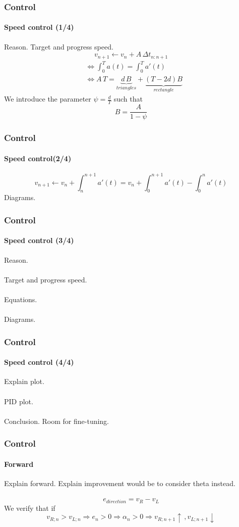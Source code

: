 \documentclass{beamer}
\begin{document}
\begin{frame}
\frametitle{Control}
\framesubtitle{Speed control (1/4)}
Reason. Target and progress speed.
$$
v_{n+1} \leftarrow v_n + A \, \Delta t_{n:n+1}
$$
\begin{align*}
&\Leftrightarrow \int_{0}^{T}a(t) =  \int_{0}^{T}a'(t) \\
&\Leftrightarrow A\,T = \underbrace{d\,B}_{triangles} + \underbrace{(T - 2d)B}_{rectangle}
\end{align*}
We introduce the parameter $\psi = \frac{d}{T}$ such that
$$
\boxed{B = \frac{A}{1-\psi}} 
$$
\end{frame}


\begin{frame}
\frametitle{Control}
\framesubtitle{Speed control(2/4)}
$$
v_{n+1} \leftarrow v_n + \int_{n}^{n+1}a'(t) = v_n + \int_{0}^{n+1}a'(t) - \int_{0}^{n}a'(t)
$$
Diagrams.
\end{frame}


\begin{frame}
\frametitle{Control}
\framesubtitle{Speed control (3/4)}
Reason.\\~\\
Target and progress speed.\\~\\
Equations.\\~\\
Diagrams.
\end{frame}


\begin{frame}
\frametitle{Control}
\framesubtitle{Speed control (4/4)}
Explain plot.\\~\\
PID plot.\\~\\
Conclusion. Room for fine-tuning.
\end{frame}


\begin{frame}
\frametitle{Control}
\framesubtitle{Forward}
Explain forward. Explain improvement would be to consider theta instead.\\~\\
$$
e_{direction} = v_R - v_L
$$
We verify that if
$$
v_{R;n} > v_{L;n} \Rightarrow e_n > 0  \Rightarrow \alpha_n > 0  \Rightarrow v_{R;n+1}\uparrow \, , v_{L;n+1}\downarrow
$$
\end{frame}
\end{document}
